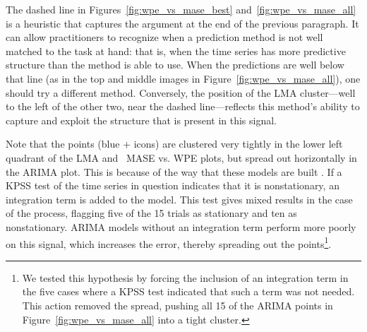 The dashed line in Figures~\ref{fig:wpe_vs_mase_best}
and~\ref{fig:wpe_vs_mase_all} is a heuristic that captures the
argument at the end of the previous paragraph.  It can allow
practitioners to recognize when a prediction method is not well
matched to the task at hand: that is, when the time series has more
predictive structure than the method is able to use.  When the
predictions are well below that line (as in the top and middle images
in Figure~\ref{fig:wpe_vs_mase_all}), one should try a different
method.  Conversely, the position of the LMA cluster---well to the
left of the other two, near the dashed line---reflects this method's
ability to capture and exploit the structure that is present in this
signal.

Note that the \col points (blue {\color{blue}$+$} icons) are clustered
very tightly in the lower left quadrant of the LMA and \naive ~MASE
vs. WPE plots, but spread out horizontally in the ARIMA plot.  This is
because of the way that these models are built \cite{autoARIMA}.  If
a KPSS test of the time series in question indicates that it is
nonstationary, an integration term is added to the model.  This test
gives mixed results in the case of the \col process, flagging five of
the 15 trials as stationary and ten as nonstationary.  ARIMA models
without an integration term perform more poorly on this signal, which
increases the error, thereby spreading out the points\footnote{We
  tested this hypothesis by forcing the inclusion of an integration
  term in the five cases where a KPSS test indicated that such a term
  was not needed.  This action removed the spread, pushing all 15 of
  the \col ARIMA points in Figure~\ref{fig:wpe_vs_mase_all} into a
  tight cluster.}.

